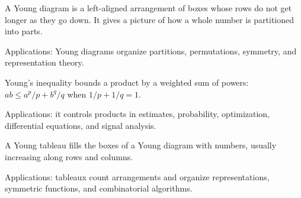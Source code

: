 A Young diagram is a left-aligned arrangement of boxes whose rows do not get longer as they go down. It gives a picture of how a whole number is partitioned into parts. \par\noindent Applications: Young diagrams organize partitions, permutations, symmetry, and representation theory.

Young's inequality bounds a product by a weighted sum of powers: $ab\leq a^p/p+b^q/q$ when $1/p+1/q=1$. \par\noindent Applications: it controls products in estimates, probability, optimization, differential equations, and signal analysis.

A Young tableau fills the boxes of a Young diagram with numbers, usually increasing along rows and columns. \par\noindent Applications: tableaux count arrangements and organize representations, symmetric functions, and combinatorial algorithms.
